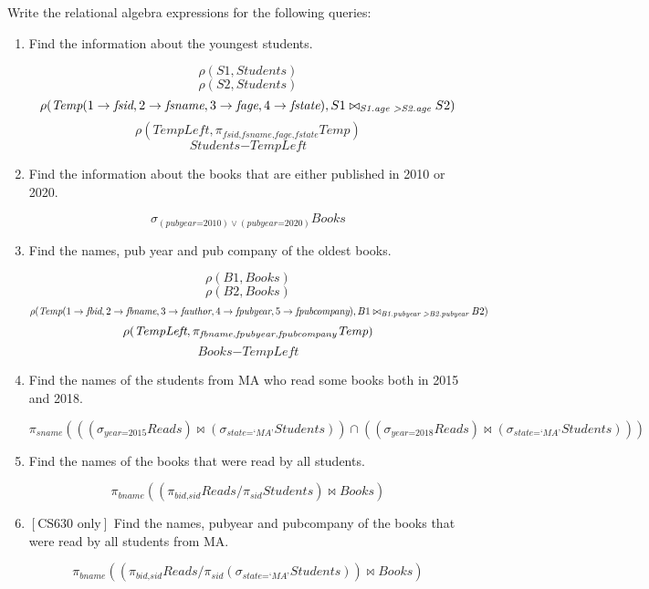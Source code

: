 \documentclass[letterpaper, 11pt]{article}
\begin{document}
Write the relational algebra expressions for the following queries:
\begin{enumerate}[label={\alph*}),leftmargin=*]
    \item Find the information about the youngest students.
    \begin{tcolorbox}
    \[\rho(S1, \textit{Students})\]
    \[\rho(S2, \textit{Students})\]
    \[\rho(\textit{Temp}(1 \to \textit{fsid}, 2 \to \textit{fsname}, 3 \to \textit{fage}, 4 \to \textit{fstate}), S1 \bowtie_{\textit{S1.age \textgreater S2.age}}S2)\]
    \[\rho(\textit{TempLeft}, \pi_{\textit{fsid,fsname,fage,fstate}}\textit{Temp})\]
    \[\textit{Students} - \textit{TempLeft}\]
    \end{tcolorbox}
    \item Find the information about the books that are either published in 2010 or 2020.
    \begin{tcolorbox}
    \[\sigma_{(\textit{pubyear=2010}) \vee (\textit{pubyear=2020})}\textit{Books}\]
    \end{tcolorbox}
    \item Find the names, pub year and pub company of the oldest books.
    \begin{tcolorbox}
    \[\rho(B1, \textit{Books})\]
    \[\rho(B2, \textit{Books})\]
    \[\rho(\textit{Temp}(1 \to \textit{fbid}, 2 \to \textit{fbname}, 3 \to \textit{fauthor}, 4 \to \textit{fpubyear}, 5 \to \textit{fpubcompany}), B1 \bowtie_{\textit{B1.pubyear \textgreater B2.pubyear}} B2)\]
    \[\rho(\textit{TempLeft}, \pi_{\textit{fbname,fpubye\textit{}ar,fpubcompany}}\textit{Temp})\]
    \[\textit{Books} - \textit{TempLeft}\]
    \end{tcolorbox}
    \item Find the names of the students from MA who read some books both in 2015 and 2018.
    \begin{tcolorbox}
    \[\pi_{\textit{sname}}(((\sigma_{\textit{year=2015}}\textit{Reads}) \bowtie (\sigma_{\textit{state=`MA'}}\textit{Students})) \cap ((\sigma_{\textit{year=2018}}\textit{Reads}) \bowtie (\sigma_{\textit{state=`MA'}}\textit{Students})))\]
    \end{tcolorbox}
    \item Find the names of the books that were read by all students.
    \begin{tcolorbox}
    \[\pi_{\textit{bname}}((\pi_{\textit{bid,sid}}\textit{Reads} / \pi_{\textit{sid}}\textit{Students}) \bowtie \textit{Books})\]
    \end{tcolorbox}    
    \item $\left[\text{CS630 only}\right]$ Find the names, pubyear and pubcompany of the books that were read by all students from MA.
    \begin{tcolorbox}
    \[\pi_{\textit{bname}}((\pi_{\textit{bid,sid}}\textit{Reads} / \pi_{\textit{sid}}(\sigma_{\textit{state=`MA'}}\textit{Students})) \bowtie \textit{Books})\]
    \end{tcolorbox}
\end{enumerate}
\end{document}
